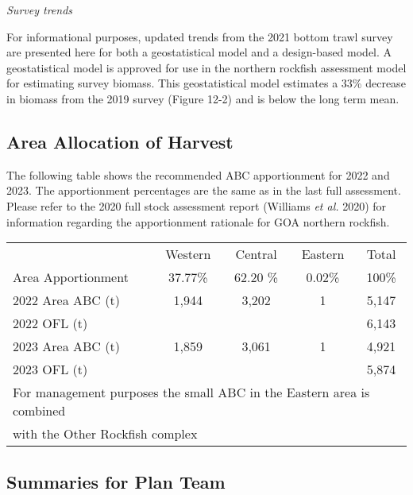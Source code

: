 \documentclass[
  11pt,
]{article}
\begin{document}
\emph{Survey trends}

For informational purposes, updated trends from the 2021 bottom trawl survey are presented here for both a geostatistical model and a design-based model.
A geostatistical model is approved for use in the northern rockfish assessment model for estimating survey biomass.
This geostatistical model estimates a 33\% decrease in biomass from the 2019 survey (Figure 12-2) and is below the long term mean.

\allsectionsfont{\raggedright}

\hypertarget{area-allocation-of-harvest}{%
\subsection{Area Allocation of Harvest}\label{area-allocation-of-harvest}}

The following table shows the recommended ABC apportionment for 2022 and 2023.
The apportionment percentages are the same as in the last full assessment.
Please refer to the 2020 full stock assessment report (Williams \emph{et al.} 2020) for information regarding the apportionment rationale for GOA northern rockfish.

\begin{center}
\begin{tabular}{ lcccc}
\hline

 & Western & Central & Eastern & Total \\
 Area Apportionment & 37.77\% & 62.20 \% & 0.02\% & 100\% \\
 \hline
 2022 Area ABC (t) & 1,944  & 3,202 & 1 & 5,147 \\
 2022 OFL (t)      &        &       &   & 6,143 \\
 2023 Area ABC (t) & 1,859  & 3,061 & 1 & 4,921 \\
 2023 OFL (t)      &        &       &   & 5,874 \\
\hline
\multicolumn{5}{l}{\footnotesize *For management purposes the small ABC in the Eastern area is combined} \\
\multicolumn{5}{l}{\footnotesize with the Other Rockfish complex} \\
\end{tabular}
\end{center}

\allsectionsfont{\raggedright}

\hypertarget{summaries-for-plan-team}{%
\subsection{Summaries for Plan Team}\label{summaries-for-plan-team}}
\end{document}
